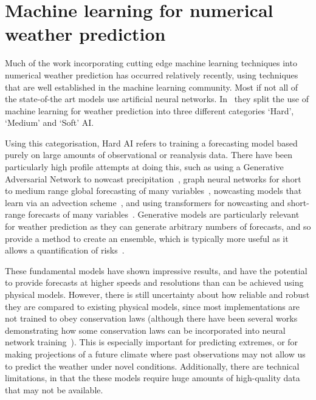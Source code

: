 \documentclass[../main.tex]{subfiles}
\begin{document}
\section{Machine learning for numerical weather prediction}

Much of the work incorporating cutting edge machine learning techniques into numerical weather prediction has occurred relatively recently, using techniques that are well established in the machine learning community. Most if not all of the state-of-the art models use artificial neural networks. In~\cite{chantry_opportunities_2021} they split the use of machine learning for weather prediction into three different categories `Hard', `Medium' and `Soft' AI.

Using this categorisation, Hard AI refers to training a forecasting model based purely on large amounts of observational or reanalysis data. There have been particularly high profile attempts at doing this, such as using a Generative Adversarial Network to nowcast precipitation~\citep{ravuri_skilful_2021}, graph neural networks for short to medium range global forecasting of many variables~\citep{lam_graphcast_2022}, nowcasting models that learn via an advection scheme~\citep{zhang_skilful_2023}, and using transformers for nowcasting and short-range forecasts of many variables~\citep{nguyen_climax_2023, bi_pangu-weather_2022}. Generative models are particularly relevant for weather prediction as they can generate arbitrary numbers of forecasts, and so provide a method to create an ensemble, which is typically more useful as it allows a quantification of risks~\citep{palmer_economic_2002}. 


These fundamental models have shown impressive results, and have the potential to provide forecasts at higher speeds and resolutions than can be achieved using physical models. However, there is still uncertainty about how reliable and robust they are compared to existing physical models, since most implementations are not trained to obey conservation laws (although there have been several works demonstrating how some conservation laws can be incorporated into neural network training~\citep{beucler_enforcing_2019, harder_generating_2022}). This is especially important for predicting extremes, or for making projections of a future climate where past observations may not allow us to predict the weather under novel conditions. Additionally, there are technical limitations, in that the these models require huge amounts of high-quality data that may not be available. 
\end{document}
